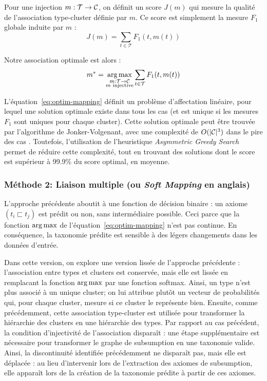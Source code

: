 Pour une injection $m : \mathcal{T} \rightarrow \mathcal{C}$, on définit un score $J(m)$ qui mesure la qualité de l'association type-cluster définie par $m$. Ce score est simplement la mesure $F_1$ globale induite par $m$ :
\begin{equation}
    J(m) = \sum_{t \in \mathcal{T}} F_1(t, m(t))
\end{equation}

Notre association optimale est alors :
\begin{equation}
    m^* = \operatorname*{arg\,max}_{
\substack{m : \mathcal{T} \rightarrow \mathcal{C} \\ m\text{ injective}}} \sum_{t \in \mathcal{T}} F_1(t, m(t))
\label{eq:optim-mapping}
\end{equation}


L'équation~\ref{eq:optim-mapping} définit un problème d'affectation linéaire, pour lequel une solution optimale existe dans tous les cas (et est unique si les mesures $F_1$ sont uniques pour chaque cluster).
Cette solution optimale peut être trouvée par l'algorithme de Jonker-Volgenant, avec une complexité de $O(|\mathcal{C}|^3)$ dans le pire des cas \cite{jonker1987shortest}. Toutefois, l'utilisation de l'heuristique \textit{Asymmetric Greedy Search} \cite{brown2017heuristic} permet de réduire cette complexité, tout en trouvant des solutions dont le score est supérieur à 99.9\% du score optimal, en moyenne.

\subsubsection{Méthode 2: Liaison multiple (ou \textit{Soft Mapping} en anglais)}
\label{ssubsec:te-softmapping}

L'approche précédente aboutit à une fonction de décision binaire : un axiome $(t_i \sqsubset t_j)$ est prédit ou non, sans intermédiaire possible. Ceci parce que la fonction $\operatorname*{arg\,max}$ de l'équation~\ref{eq:optim-mapping} n'est pas continue. En conséquence, la taxonomie prédite est sensible à des légers changements dans les données d'entrée.

Dans cette version, on explore une version lissée de l'approche précédente : l'association entre types et clusters est conservée, mais elle est lissée en remplacant la fonction $\operatorname*{arg\,max}$ par une fonction softmax. Ainsi, un type n'est plus associé à un unique cluster; on lui attribue plutôt un vecteur de probabilités qui, pour chaque cluster, mesure si ce cluster le représente  bien. Ensuite, comme précédemment, cette association type-cluster est utilisée pour transformer la hiérarchie des clusters en une hiérarchie des types. Par rapport au cas précédent, la condition d'injectivité de l'association disparaît : une étape supplémentaire est nécessaire pour transformer le graphe de subsumption en une taxonomie valide. Ainsi, la discontinuité identifiée précédemment ne disparaît pas, mais elle est déplacée : au lieu d'intervenir lors de l'extraction des axiomes de subsumption, elle apparaît lors de la création de la taxonomie prédite à partir de ces axiomes. 

